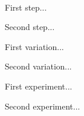 \begin{ingredientcolumns}[1]

	\begin{ingredientblock}[glaze]
		\\
	\end{ingredientblock}

\end{ingredientcolumns}

\begin{preparation}
\item First step...
\item Second step...
\end{preparation}


\begin{variation}
\item First variation...
\item Second variation...
\end{variation}


\begin{experiments}
\item First experiment...
\item Second experiment...
\end{experiments}


\recipeend
